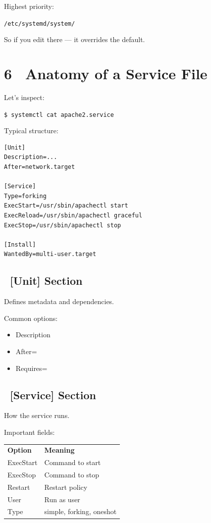 \documentclass[12pt]{article}
\begin{document}
Highest priority:

\begin{highlightbox}
\texttt{/etc/systemd/system/}
\end{highlightbox}

So if you edit there — it overrides the default.

\section*{6 \faFileCode\ Anatomy of a Service File}

Let's inspect:

\begin{highlightbox}
\texttt{\$ systemctl cat apache2.service}
\end{highlightbox}

Typical structure:

\begin{highlightbox}
\begin{verbatim}
[Unit]
Description=...
After=network.target

[Service]
Type=forking
ExecStart=/usr/sbin/apachectl start
ExecReload=/usr/sbin/apachectl graceful
ExecStop=/usr/sbin/apachectl stop

[Install]
WantedBy=multi-user.target
\end{verbatim}
\end{highlightbox}

\subsection*{\faList\ [Unit] Section}

Defines metadata and dependencies.

Common options:

\begin{itemize}
    \item Description
    \item After=
    \item Requires=
\end{itemize}

\subsection*{\faCog\ [Service] Section}

How the service runs.

Important fields:

\begin{infobox}
\begin{tabular}{ll}
\textbf{Option} & \textbf{Meaning} \\
ExecStart & Command to start \\
ExecStop & Command to stop \\
Restart & Restart policy \\
User & Run as user \\
Type & simple, forking, oneshot \\
\end{tabular}
\end{infobox}
\end{document}
